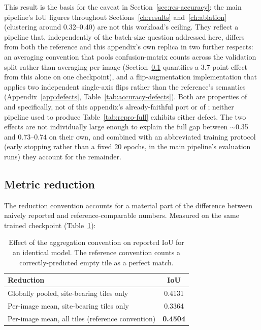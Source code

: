This result is the basis for the caveat in Section~\ref{sec:res-accuracy}: the
main \pads{} pipeline's IoU figures throughout Sections~\ref{ch:results}
and~\ref{ch:ablation} (clustering around 0.32--0.40) are not this workload's
ceiling. They reflect a pipeline that, independently of the batch-size question
addressed here, differs from both the reference and this appendix's own replica
in two further respects: an  averaging convention that pools
confusion-matrix counts across the validation split rather than averaging
per-image (Section~\ref{sec:repro-metric} quantifies a 3.7-point effect from this
alone on one checkpoint), and a flip-augmentation implementation that applies two
independent single-axis flips rather than the reference's 
semantics (Appendix~\ref{app:defects}, Table~\ref{tab:accuracy-defects}).
Both are properties of  and 
specifically, not of this appendix's already-faithful port or of
; neither pipeline used to produce
Table~\ref{tab:repro-full} exhibits either defect. The two effects are not
individually large enough to explain the full gap between $\sim$0.35 and
$0.73$--$0.74$ on their own, and combined with an abbreviated training protocol
(early stopping rather than a fixed 20 epochs, in the main pipeline's evaluation
runs) they account for the remainder.

\subsection{Metric reduction}
\label{sec:repro-metric}

The reduction convention accounts for a material part of the difference between
naively reported and reference-comparable numbers.
Measured on the same trained checkpoint (Table~\ref{tab:reduction}):

\begin{table}[!ht]
\centering
\begin{tabular}{lc}
\toprule
Reduction & IoU \\
\midrule
Globally pooled, site-bearing tiles only          & 0.4131 \\
Per-image mean, site-bearing tiles only           & 0.3364 \\
Per-image mean, all tiles (reference convention)  & \textbf{0.4504} \\
\bottomrule
\end{tabular}
\caption[Effect of the IoU aggregation convention]{Effect of the aggregation convention on reported IoU for an identical
model. The reference convention counts a correctly-predicted empty tile as a
perfect match.}
\label{tab:reduction}
\end{table}

